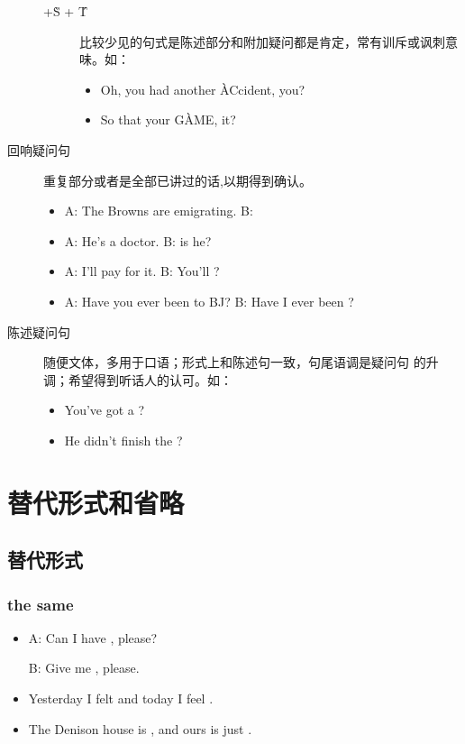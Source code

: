 \begin{description}
\begin{description}
  \item[+\`S + \'T] 比较少见的句式是陈述部分和附加疑问都是肯定，常有训斥或讽刺意味。如：
    \begin{itemize}
    \item Oh, you had another \`ACcident,  you?
    \item So that your G\`AME,  it?
    \end{itemize}
  \end{description}


\item[回响疑问句] 重复部分或者是全部已讲过的话,以期得到确认。
\begin{itemize}
\item A: The Browns are emigrating. \qquad B: 
\item A: He's a doctor. \qquad B:  is he?
\item A: I'll pay for it. \qquad B: You'll ?
\item A: Have you ever been to BJ? \qquad B: Have I ever been ?
\end{itemize}

\item[陈述疑问句] 随便文体，多用于口语；形式上和陈述句一致，句尾语调是疑问句
  的升调；希望得到听话人的认可。如：
  \begin{itemize}
  \item You've got a ?
  \item He didn't finish the ?
  \end{itemize}
\end{description}


\section{替代形式和省略}

\subsection{替代形式}

\subsubsection{the same}

\begin{itemize}
\item A: Can I have , please?

  B: Give me , please.

\item Yesterday I felt  and today I feel .

\item The Denison house is , and ours is
  just .

\end{itemize}

